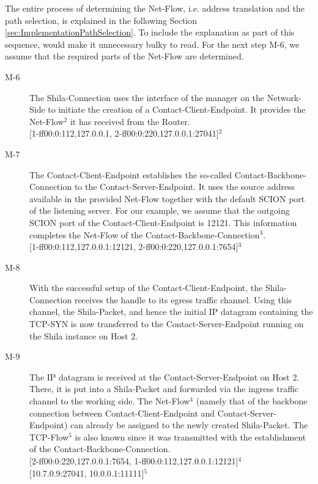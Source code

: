 The entire process of determining the Net-Flow, i.e. address translation and the path selection, is explained in the following Section \ref{sec:ImplementationPathSelection}. To include the explanation as part of this sequence, would make it unnecessary bulky to read. For the next step M-6, we assume that the required parts of the Net-Flow are determined.

\begin{description}
	\item[M-6] The Shila-Connection uses the interface of the manager on the Network-Side to initiate the creation of a Contact-Client-Endpoint. It provides the Net-Flow$^2$ it has received from the Router.\medskip\\{\small[1-ff00:0:112,127.0.0.1, 2-ff00:0:220,127.0.0.1:27041]$^2$}
	\item[M-7] The Contact-Client-Endpoint establishes the so-called Contact-Backbone-Connection to the Contact-Server-Endpoint. It uses the source address available in the provided Net-Flow together with the default SCION port of the listening server. For our example, we assume that the outgoing SCION port of the Contact-Client-Endpoint is 12121. This information completes the Net-Flow of the Contact-Backbone-Connection$^{3}$.\medskip\\{\small [1-ff00:0:112,127.0.0.1:12121, 2-ff00:0:220,127.0.0.1:7654]$^{3}$}
%	
%	
	\item[M-8] With the successful setup of the Contact-Client-Endpoint, the Shila-Connection receives the handle to its egress traffic channel. Using this channel, the Shila-Packet, and hence the initial IP datagram containing the TCP-SYN is now transferred to the Contact-Server-Endpoint running on the Shila instance on Host 2. %
	\item[M-9] The IP datagram is received at the Contact-Server-Endpoint on Host 2. There, it is put into a Shila-Packet and forwarded via the ingress traffic channel to the working side. The Net-Flow$^{4}$ (namely that of the backbone connection between Contact-Client-Endpoint and Contact-Server-Endpoint) can already be assigned to the newly created Shila-Packet. The TCP-Flow$^{5}$ is also known since it was transmitted with the establishment of the Contact-Backbone-Connection.\medskip\\{\small [2-ff00:0:220,127.0.0.1:7654, 1-ff00:0:112,127.0.0.1:12121]$^{4}$}\\{\small [10.7.0.9:27041, 10.0.0.1:11111]$^{5}$} 

\end{description}
